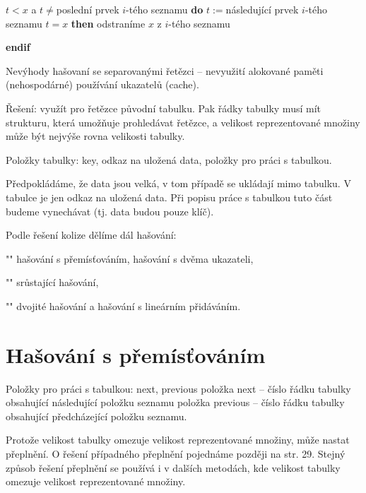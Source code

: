 \documentclass[a4paper,12pt]{article}
\begin{document}
\phantom{---}{\bf while} $t<x$ a $t\ne$poslední prvek $i$-tého seznamu {\bf do}\newline 
\phantom{------}$t:=$následující prvek $i$-tého seznamu\newline 
\phantom{---}{\bf enddo\newline 
endif\newline 
if} $t=x$ {\bf then} odstraníme $x$ z $i$-tého seznamu {\bf endif


}
Nevýhody hašovaní se separovanými řetězci --\newline 
\phantom{---}nevyužití alokované paměti (nehospodárné)\newline 
\phantom{---}používání ukazatelů (cache).\newline 

Řešení: využít pro řetězce původní tabulku. Pak řádky tabulky musí mít strukturu, která umožňuje prohledávat řetězce, a velikost reprezentované množiny 
může být nejvýše rovna velikosti tabulky.  

Položky tabulky:\newline 
\phantom{---}key,\newline 
\phantom{---}odkaz na uložená data,\newline 
\phantom{---}položky pro práci s tabulkou.

Předpokládáme, že data jsou velká, v tom případě se 
ukládají mimo tabulku. V tabulce je jen odkaz na uložená data. 
Při popisu práce s tabulkou tuto část budeme vynechávat (tj. 
data budou pouze klíč).

Podle řešení kolize dělíme dál hašování:
\roster
\item"{}"
hašování s přemísťováním, hašování s dvěma 
ukazateli, 
\item"{}"
srůstající hašování,
\item"{}"
dvojité hašování a hašování s lineárním 
přidáváním.
\endroster

\section{Hašování s přemísťováním}

Položky pro práci s tabulkou: next, previous\newline 
\phantom{---}položka next -- číslo řádku tabulky 
obsahující následující polož\-ku seznamu\newline 
\phantom{---}položka previous -- číslo řádku tabulky obsahující 
předcházející položku seznamu.

Protože velikost tabulky omezuje velikost reprezentované množiny, může nastat přeplnění. O řešení 
případného přeplnění pojednáme později na str. 29. Stejný způsob řešení přeplnění se používá i v dalších metodách, kde velikost tabulky omezuje velikost reprezentované množiny.
\end{document}
